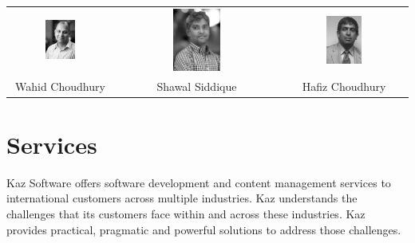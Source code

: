 \setlength{\tabcolsep}{4pt}
\begin{center}
    \begin{tabular}{ccc}
    \includegraphics[width=0.3\textwidth]{images/Chapter2/Wahid.png} & \includegraphics[width=0.305\textwidth]{images/Chapter2/Shaon_color.png} & \includegraphics[width=0.302\textwidth]{images/Chapter2/HafizChoudhury_.png} \\
    Wahid Choudhury & Shawal Siddique & Hafiz Choudhury  \\
    \end{tabular}
\end{center}

\section{Services}

Kaz Software offers software development and content management services to international customers across multiple industries.
Kaz understands the challenges that its customers face within and across these industries.
Kaz provides practical, pragmatic and powerful solutions to address those challenges.

